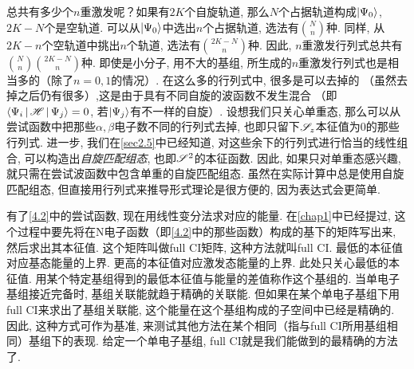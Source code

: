 总共有多少个$n$重激发呢？如果有$2K$个自旋轨道, 那么$N$个占据轨道构成$\Ket{\Psi_0}$, $2K-N$个是空轨道. 可以从$\Ket{\Psi_0}$中选出$n$个占据轨道, 选法有$\binom{N}{n}$种. 同样, 从$2K-n$个空轨道中挑出$n$个轨道, 选法有$\binom{2K-N}{n}$种. 因此, $n$重激发行列式总共有$\binom{N}{n}\binom{2K-N}{n}$种. 即使是小分子, 用不大的基组, 所生成的$n$重激发行列式也是相当多的（除了$n=0,1$的情况）. 在这么多的行列式中, 很多是可以去掉的 （虽然去掉之后仍有很多）,这是由于具有不同自旋的波函数不发生混合 （即$\Braket{\Psi_i|\mathscr{H}|\Psi_j}=0$, 若$\Ket{\Psi_j}$有不一样的自旋）. 设想我们只关心单重态, 那么可以从尝试函数中把那些$\alpha,\beta$电子数不同的行列式去掉, 也即只留下$\mathscr{S}_z$本征值为0的那些行列式. 进一步, 我们在\ref{sec2.5}中已经知道, 对这些余下的行列式进行恰当的线性组合, 可以构造出\emph{自旋匹配组态}, 也即$\mathscr{S}^2$的本征函数. 因此, 如果只对单重态感兴趣, 就只需在尝试波函数中包含单重的自旋匹配组态. 虽然在实际计算中总是使用自旋匹配组态, 但直接用行列式来推导形式理论是很方便的, 因为表达式会更简单.

有了\eqref{4.2}中的尝试函数, 现在用线性变分法求对应的能量. 在\ref{chap1}中已经提过, 这个过程中要先将\ha 在N电子函数（即\eqref{4.2}中的那些函数）构成的基下的矩阵写出来, 然后求出其本征值. 这个矩阵叫做full CI矩阵, 这种方法就叫full CI. 最低的本征值对应基态能量的上界. 更高的本征值对应激发态能量的上界. 此处只关心最低的本征值. 用某个特定基组得到的最低本征值与\hft 能量的差值称作这个基组的. 当单电子基组接近完备时, 基组关联能就趋于精确的关联能. 但如果在某个单电子基组下用full CI来求出了基组关联能, 这个能量在这个基组构成的子空间中已经是精确的. 因此, 这种方式可作为基准, 来测试其他方法在某个相同（指与full CI所用基组相同）基组下的表现. 给定一个单电子基组, full CI就是我们能做到的最精确的方法了.

